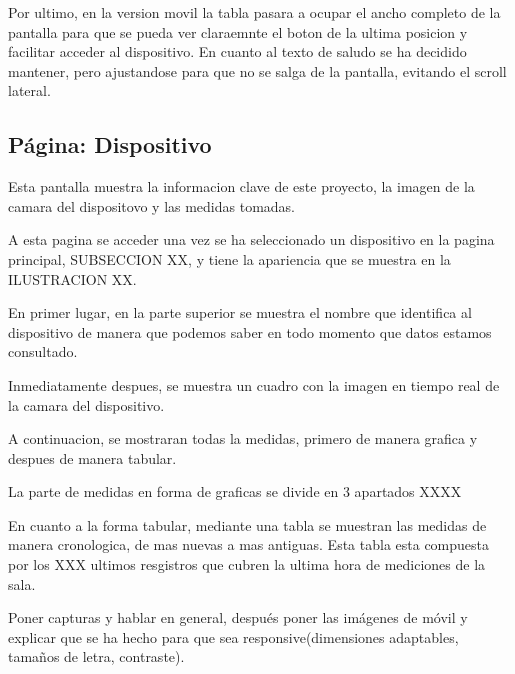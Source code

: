 Por ultimo, en la version movil la tabla pasara a ocupar el ancho completo de la pantalla para que se pueda ver claraemnte el boton de la ultima posicion y facilitar acceder al dispositivo. En cuanto al texto de saludo se ha decidido mantener, pero ajustandose para que no se salga de la pantalla, evitando el scroll lateral.

\subsection{Página: Dispositivo}
Esta pantalla muestra la informacion clave de este proyecto, la imagen de la camara del dispositovo y las medidas tomadas. 

A esta pagina se acceder una vez se ha seleccionado un dispositivo en la pagina principal, SUBSECCION XX, y tiene la apariencia que se muestra en la ILUSTRACION XX.

En primer lugar, en la parte superior se muestra el nombre que identifica al dispositivo de manera que podemos saber en todo momento que datos estamos consultado.

Inmediatamente despues, se muestra un cuadro con la imagen en tiempo real de la camara del dispositivo.

A continuacion, se mostraran todas la medidas, primero de manera grafica y despues de manera tabular. 

La parte de medidas en forma de graficas se divide en 3 apartados XXXX

En cuanto a la forma tabular, mediante una tabla se muestran las medidas de manera cronologica, de mas nuevas a mas antiguas. Esta tabla esta compuesta por los XXX ultimos resgistros que cubren la ultima hora de mediciones de la sala.


Poner capturas y hablar en general, después poner las imágenes de móvil y explicar que se ha hecho para que sea responsive(dimensiones adaptables, tamaños de letra, contraste).
